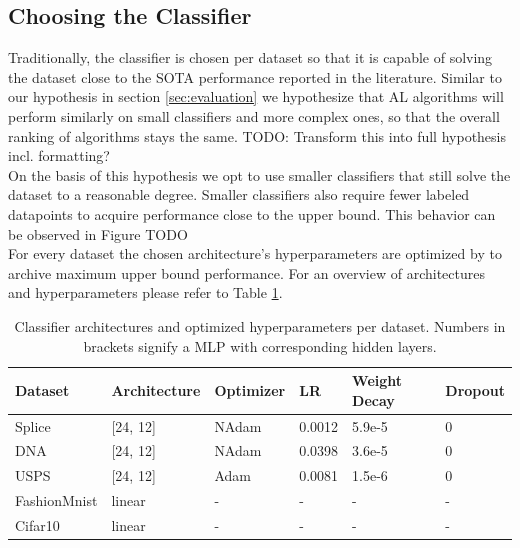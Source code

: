 \documentclass[]{article}
\begin{document}
\subsection{Choosing the Classifier}\label{sec:choosing_the_classifier}
Traditionally, the classifier is chosen per dataset so that it is capable of solving the dataset close to the SOTA performance reported in the literature.
Similar to our hypothesis in section \ref{sec:evaluation} we hypothesize that AL algorithms will perform similarly on small classifiers and more complex ones, so that the overall ranking of algorithms stays the same.
{\color{red} TODO: Transform this into full hypothesis incl. formatting?}\\
On the basis of this hypothesis we opt to use smaller classifiers that still solve the dataset to a reasonable degree.
Smaller classifiers also require fewer labeled datapoints to acquire performance close to the upper bound.
This behavior can be observed in Figure {\color{red} TODO} \\ [1mm]
For every dataset the chosen architecture's hyperparameters are optimized by to archive maximum upper bound performance.
For an overview of architectures and hyperparameters please refer to Table \ref{tab:architectures}.
\begin{table}
	\centering
	\begin{tabular}{l || l | l l l l}
		Dataset & Architecture & Optimizer & LR & Weight Decay & Dropout \\
		\hline
		Splice & [24, 12] & NAdam & 0.0012 & 5.9e-5 & 0 \\
		DNA & [24, 12] & NAdam & 0.0398 & 3.6e-5 & 0 \\
		USPS & [24, 12] & Adam & 0.0081 & 1.5e-6 & 0 \\
		FashionMnist & linear & - & - & - & - \\
		Cifar10 & linear & - & - & - & - \\
	\end{tabular}
	\caption{Classifier architectures and optimized hyperparameters per dataset. Numbers in brackets signify a MLP with corresponding hidden layers.}
	\label{tab:architectures}
\end{table}

\end{document}
